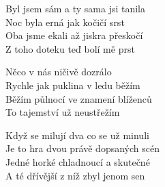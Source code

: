 
\ve{}
Byl jsem sám a ty sama jsi tanila \quad {}\\
Noc byla erná jak kočičí srst \\
Oba jsme ekali až jiskra přeskočí\\
Z toho doteku teď bolí mě prst 

\ve{}
Něco v nás ničivě dozrálo\\
Rychle jak puklina v ledu běžím\\
Běžím půlnocí ve znamení blíženců\\
To tajemství už neustřežím

\ve{}
Když se milují dva co se už minuli\\
Je to hra dvou právě dopsaných scén\\
Jedné horké chladnoucí a skutečné\\
A té dřívější z níž zbyl jenom sen 

\esong{}